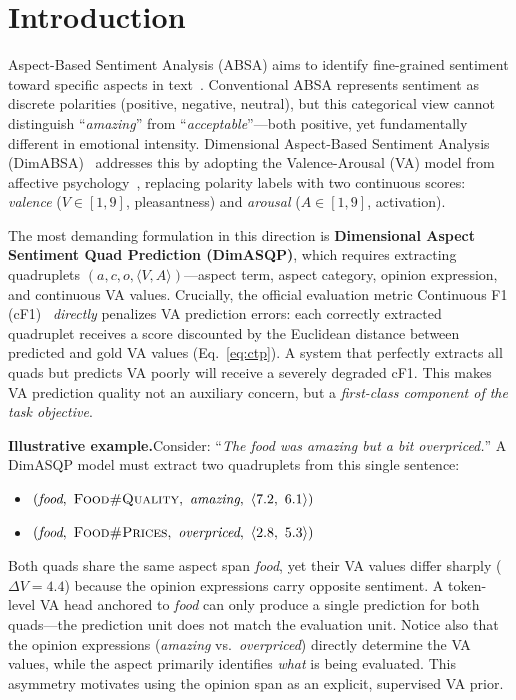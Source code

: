 \documentclass[runningheads]{llncs}
\begin{document}
\section{Introduction}
\label{sec:intro}

Aspect-Based Sentiment Analysis (ABSA) aims to identify fine-grained sentiment toward specific aspects in text~\cite{pontiki2014semeval,pontiki2016semeval,zhang2022survey}. Conventional ABSA represents sentiment as discrete polarities (positive, negative, neutral), but this categorical view cannot distinguish ``\emph{amazing}'' from ``\emph{acceptable}''---both positive, yet fundamentally different in emotional intensity. Dimensional Aspect-Based Sentiment Analysis (DimABSA)~\cite{dimabsa2026} addresses this by adopting the Valence-Arousal (VA) model from affective psychology~\cite{russell1980circumplex}, replacing polarity labels with two continuous scores: \emph{valence} ($V \in [1,9]$, pleasantness) and \emph{arousal} ($A \in [1,9]$, activation).

The most demanding formulation in this direction is \textbf{Dimensional Aspect Sentiment Quad Prediction (DimASQP)}, which requires extracting quadruplets $(a, c, o, \langle V, A \rangle)$---aspect term, aspect category, opinion expression, and continuous VA values. Crucially, the official evaluation metric Continuous F1 (cF1)~\cite{dimabsa2026} \emph{directly} penalizes VA prediction errors: each correctly extracted quadruplet receives a score discounted by the Euclidean distance between predicted and gold VA values (Eq.~\ref{eq:ctp}). A system that perfectly extracts all quads but predicts VA poorly will receive a severely degraded cF1. This makes VA prediction quality not an auxiliary concern, but a \emph{first-class component of the task objective}.

\smallskip
\noindent\textbf{Illustrative example.}\quad Consider: ``\emph{The food was amazing but a bit overpriced.}'' A DimASQP model must extract two quadruplets from this single sentence:
\begin{itemize}
    \item $(\textit{food},\ \textsc{Food\#Quality},\ \textit{amazing},\ \langle 7.2,\ 6.1\rangle)$
    \item $(\textit{food},\ \textsc{Food\#Prices},\ \textit{overpriced},\ \langle 2.8,\ 5.3\rangle)$
\end{itemize}
Both quads share the same aspect span \emph{food}, yet their VA values differ sharply ($\Delta V \!=\! 4.4$) because the opinion expressions carry opposite sentiment. A token-level VA head anchored to \emph{food} can only produce a single prediction for both quads---the prediction unit does not match the evaluation unit. Notice also that the opinion expressions (\emph{amazing} vs.\ \emph{overpriced}) directly determine the VA values, while the aspect primarily identifies \emph{what} is being evaluated. This asymmetry motivates using the opinion span as an explicit, supervised VA prior.
\smallskip
\end{document}
